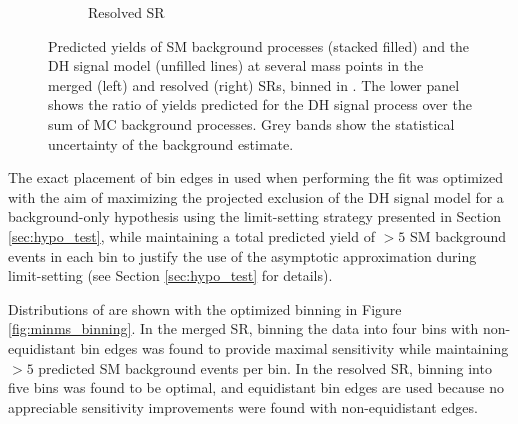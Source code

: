 \begin{figure}[htbp]
\begin{subfigure}[t]{0.48\textwidth}
     \caption{Resolved SR}
    \end{subfigure}
    \caption{Predicted yields of SM background processes (stacked filled) and the DH signal model (unfilled lines) at several mass points in the merged (left) and resolved (right) SRs, binned in \minms. The lower panel shows the ratio of yields predicted for the DH signal process over the sum of MC background processes. Grey bands show the statistical uncertainty of the background estimate.}
   \label{fig:minms_shape_discrimination}
\end{figure}


The exact placement of bin edges in \minms used when performing the fit was optimized with the aim of maximizing the projected exclusion of the DH signal model for a background-only hypothesis using the limit-setting strategy presented in Section \ref{sec:hypo_test}, while maintaining a total predicted yield of \(>5\) SM background events in each bin to justify the use of the asymptotic approximation during limit-setting (see Section \ref{sec:hypo_test} for details). 

Distributions of \minms are shown with the optimized binning in Figure \ref{fig:minms_binning}. In the merged SR, binning the data into four \minms bins with non-equidistant bin edges was found to provide maximal sensitivity while maintaining \(>5\) predicted SM background events per bin. In the resolved SR, binning into five \minms bins was found to be optimal, and equidistant bin edges are used because no appreciable sensitivity improvements were found with non-equidistant edges.

